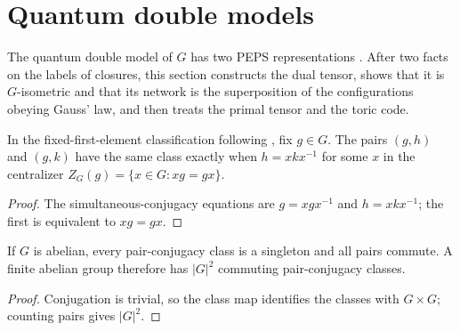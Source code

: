 \section{Quantum double models}%
\label{sec:peps_quantum_double_models}

The quantum double model of $G$ has two PEPS representations
\cite[Appendix~A, ``The Toric Code and quantum double models'']{Cirac2021Matrix}.
After two facts on the labels of closures, this section constructs the dual
tensor, shows that it is $G$-isometric and that its network is the
superposition of the configurations obeying Gauss' law, and then treats the
primal tensor and the toric code.

\begin{lemma}%
    \label{thm:peps_pair_conjugacy_centralizer}
    \leanok
    In the fixed-first-element classification following
    \cite[Theorem~5.9]{Schuch2010PEPS}, fix $g\in G$. The pairs $(g,h)$ and $(g,k)$ have the same class
    exactly when $h=xkx^{-1}$ for some $x$ in the centralizer
    $Z_G(g)=\{x\in G:xg=gx\}$.
\end{lemma}

\begin{proof}\leanok
    The simultaneous-conjugacy equations are $g=xgx^{-1}$ and
    $h=xkx^{-1}$; the first is equivalent to $xg=gx$.
\end{proof}

\begin{lemma}%
    \label{thm:peps_abelian_pair_classes}
    \leanok
    If $G$ is abelian, every pair-conjugacy class is a singleton and all
    pairs commute. A finite abelian group therefore has $|G|^2$
    commuting pair-conjugacy classes.
\end{lemma}

\begin{proof}\leanok
    Conjugation is trivial, so the class map identifies the classes with
    $G\times G$; counting pairs gives $|G|^2$.
\end{proof}

